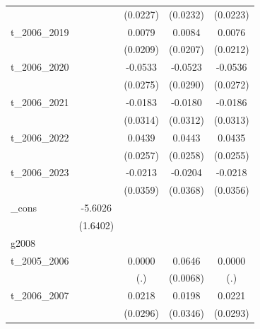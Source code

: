 \begin{table}[htbp]
\begin{tabular}{l*{4}{c}}
            &                     &    (0.0227)         &    (0.0232)         &    (0.0223)         \\
[1em]
t\_2006\_2019 &                     &      0.0079         &      0.0084         &      0.0076         \\
            &                     &    (0.0209)         &    (0.0207)         &    (0.0212)         \\
[1em]
t\_2006\_2020 &                     &     -0.0533\sym{*}  &     -0.0523\sym{*}  &     -0.0536\sym{**} \\
            &                     &    (0.0275)         &    (0.0290)         &    (0.0272)         \\
[1em]
t\_2006\_2021 &                     &     -0.0183         &     -0.0180         &     -0.0186         \\
            &                     &    (0.0314)         &    (0.0312)         &    (0.0313)         \\
[1em]
t\_2006\_2022 &                     &      0.0439\sym{*}  &      0.0443\sym{*}  &      0.0435\sym{*}  \\
            &                     &    (0.0257)         &    (0.0258)         &    (0.0255)         \\
[1em]
t\_2006\_2023 &                     &     -0.0213         &     -0.0204         &     -0.0218         \\
            &                     &    (0.0359)         &    (0.0368)         &    (0.0356)         \\
[1em]
\_cons      &     -5.6026\sym{***}&                     &                     &                     \\
            &    (1.6402)         &                     &                     &                     \\
\hline
g2008       &                     &                     &                     &                     \\
t\_2005\_2006 &                     &      0.0000         &      0.0646\sym{***}&      0.0000         \\
            &                     &         (.)         &    (0.0068)         &         (.)         \\
[1em]
t\_2006\_2007 &                     &      0.0218         &      0.0198         &      0.0221         \\
            &                     &    (0.0296)         &    (0.0346)         &    (0.0293)         \\

\end{tabular}
\end{table}
